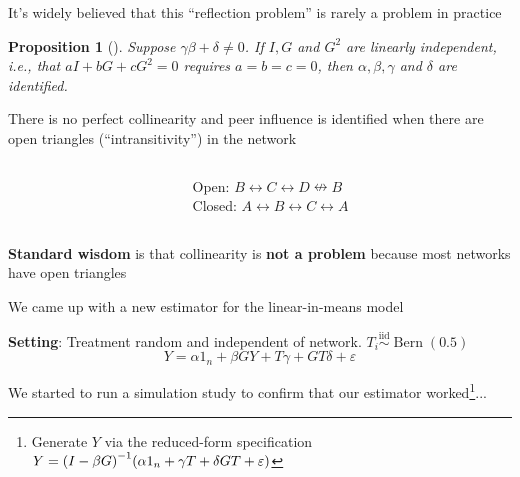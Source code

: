 \documentclass[aspectratio=169]{beamer}
\DeclarePairedDelimiter{\paren}{(}{)}
\newcommand \diid {\stackrel{\mathrm{iid}}{\sim}}
\DeclareMathOperator*{\Bern}{Bern}
\newtheorem{proposition}{Proposition}
\theoremstyle{remark}
\begin{document}
\begin{frame}{It's widely believed that this ``reflection problem'' is rarely a problem in practice}
    
    \begin{proposition}[\citealt{bramoulle2009}]
        Suppose $\gamma \beta + \delta \neq 0$. If $I, G$ and $G^2$ are linearly independent, i.e., that $a I + b G + c G^2 = 0$ requires $a = b = c = 0$, then $\alpha, \beta, \gamma$ and $\delta$ are identified.
    \end{proposition}
    
    There is no perfect collinearity and peer influence is identified when there are \textcolor{Mahogany}{open triangles} (``intransitivity'') in the network
    \begin{columns}
        \begin{column}{0.5\textwidth}
            \centering
        \end{column}
        \begin{column}{0.5\textwidth}
            \centering
            Open: \textcolor{Mahogany}{$B \leftrightarrow C \leftrightarrow D \nleftrightarrow B$} \\
            Closed: $A \leftrightarrow B \leftrightarrow C \leftrightarrow A$
        \end{column}
    \end{columns}
    \vspace{2mm}
    \textbf{Standard wisdom} is that collinearity is \textbf{not a problem} because most networks have open triangles
\end{frame}

\begin{frame}{We came up with a new estimator for the linear-in-means model}
    
    \textbf{Setting}: Treatment random and independent of network. $T_i \diid \Bern(0.5)$ \\
    
    \Large
    \begin{equation*}
        Y = \alpha 1_n + \beta G Y + T \gamma + G T \delta + \varepsilon
    \end{equation*}
    
    \normalsize
    We started to run a simulation study to confirm that our estimator worked\footnote{Generate $Y$ via the reduced-form specification $Y = \paren*{I - \beta G}^{-1} \paren*{\alpha 1_n + \gamma T + \delta G T + \varepsilon}$}...
    
\end{frame}
\end{document}
